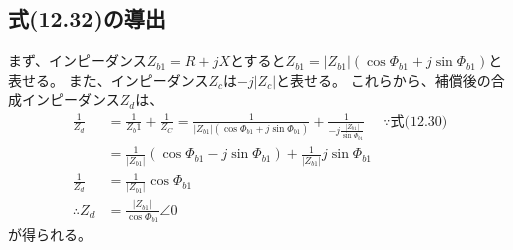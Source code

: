 \documentclass[fleqn,11pt,a4paper,dvipdfmx]{jsarticle}
\numberwithin{equation}{section}
\begin{document}
\subsection*{式(12.32)の導出}
まず、インピーダンス$Z_{b1} = R + jX$とすると$Z_{b1} = \left|Z_{b1}\right| \left(\cos \Phi_{b1} + j\sin\Phi_{b1}\right)$と表せる。
また、インピーダンス$Z_c$は$-j\left|Z_c\right|$と表せる。
これらから、補償後の合成インピーダンス$Z_d$は、
\begin{align*}
  \frac{1}{Z_d} &= \frac{1}{Z_b1} + \frac{1}{Z_C} 
  = \frac{1}{\left|Z_{b1}\right| \left(\cos \Phi_{b1} + j\sin\Phi_{b1}\right) } + \frac{1}{-j \frac{\left| Z_{b1} \right|}{\sin \Phi_{b1}}}
  &\because \text{式(12.30)}\\
                &= \frac{1}{\left|Z_{b1}\right|} \left(\cos \Phi_{b1} - j\sin\Phi_{b1}\right) + \frac{1}{\left| Z_{b1} \right|}j\sin \Phi_{b1}\\
  \frac{1}{Z_d} &= \frac{1}{\left|Z_{b1}\right|}\cos \Phi_{b1} \\
  \therefore Z_d &=  \frac{\left|Z_{b1}\right|}{\cos \Phi_{b1}} \angle 0
\end{align*}
が得られる。
\end{document}
